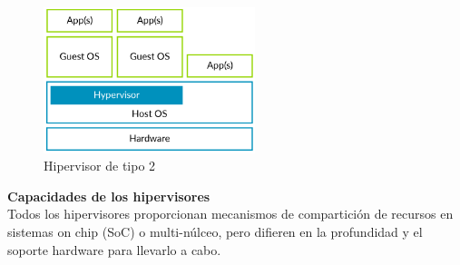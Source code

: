 \begin{itemize}
\begin{figure}[!h]
	\centering
	\includegraphics[width=0.55\textwidth]{recursos/type2_hyp.png}
	\caption{Hipervisor de tipo 2}
	\label{fig:hyper_type2}
\end{figure}
\end{itemize}

\textbf{Capacidades de los hipervisores}\\
Todos los hipervisores proporcionan mecanismos de compartición de recursos en sistemas on chip (\acrshort{SoC}) o multi-núlceo, pero difieren en la profundidad y el soporte hardware para llevarlo a cabo.

